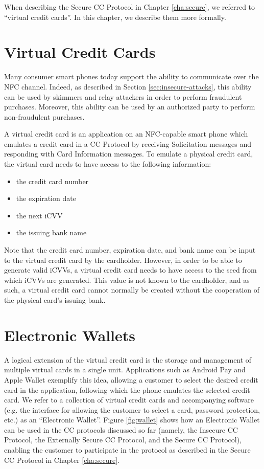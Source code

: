 When describing the Secure CC Protocol in Chapter \ref{cha:secure}, we referred to ``virtual credit cards''.
In this chapter, we describe them more formally.

\section{Virtual Credit Cards}

Many consumer smart phones today support the ability to communicate over the NFC channel.
Indeed, as described in Section \ref{sec:insecure-attacks}, this ability can be used by skimmers and relay attackers in order to perform fraudulent purchases.
Moreover, this ability can be used by an authorized party to perform non-fraudulent purchases.

A virtual credit card is an application on an NFC-capable smart phone which emulates a credit card in a CC Protocol
    by receiving Solicitation messages and responding with Card Information messages.
To emulate a physical credit card, the virtual card needs to have access to the following information:

\begin{itemize}
\item the credit card number
\item the expiration date
\item the next iCVV
\item the issuing bank name
\end{itemize}

Note that the credit card number, expiration date, and bank name can be input to the virtual credit card by the cardholder.
However, in order to be able to generate valid iCVVs, a virtual credit card needs to have access to the seed from which iCVVs are generated.
This value is not known to the cardholder, and as such, a virtual credit card cannot normally be created without the cooperation of the physical card's issuing bank.


\section{Electronic Wallets}
A logical extension of the virtual credit card is the storage and management of multiple virtual cards in a single unit.
Applications such as Android Pay and Apple Wallet exemplify this idea,
    allowing a customer to select the desired credit card in the application,
    following which the phone emulates the selected credit card.
We refer to a collection of virtual credit cards and accompanying software
    (e.g. the interface for allowing the customer to select a card, password protection, etc.) as an ``Electronic Wallet''.
Figure \ref{fig:wallet} shows how an Electronic Wallet can be used in the CC protocols discussed so far
    (namely, the Insecure CC Protocol, the Externally Secure CC Protocol, and the Secure CC Protocol),
    enabling the customer to participate in the protocol as described in the Secure CC Protocol in Chapter \ref{cha:secure}.

